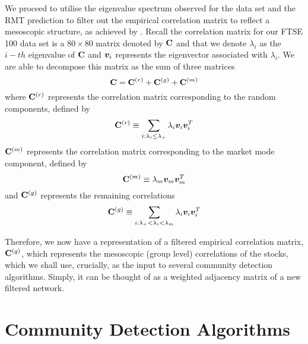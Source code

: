 We proceed to utilise the eigenvalue spectrum observed for the data set and the RMT prediction to filter out the empirical correlation matrix to reflect a mesoscopic structure, as achieved by \cite{MG13}. Recall the correlation matrix for our FTSE 100 data set is a $80 \times 80$ matrix denoted by $\mathbf C$ and that we denote $\lambda_{i}$ as the $i-th$ eigenvalue of $\mathbf C$ and $\vecvar{v_{i}}$ represents the eigenvector associated with $\lambda_{i}$. We are able to decompose this matrix as the sum of three matrices
\begin{equation}
\label{eq:decompositionCorrelationMatrix}
	\mathbf C = \mathbf C^{(r)} + \mathbf C^{(g)} + \mathbf C^{(m)}
\end{equation}
where $\mathbf C^{(r)}$ represents the correlation matrix corresponding to the random components, defined by
\begin{equation}
\label{eq:randomCorrelationMatrix}
	\matvar{C}^{(r)} \equiv \sum_{i:\lambda_{i}\leq\lambda_{+}} \lambda_{i} \vecvar{v_{i}} \transpose{\vecvar{v_{i}}}
\end{equation}
$\mathbf C^{(m)}$ represents the correlation matrix corresponding to the market mode component, defined by
\begin{equation}
\label{eq:marketModeCorrelationMatrix}
	\matvar{C}^{(m)} \equiv \lambda_{m} \vecvar{v_{m}} \transpose{\vecvar{v_{m}}}
\end{equation}
and $\mathbf C^{(g)}$ represents the remaining correlations
\begin{equation}
\label{eq:remainingCorrelationMatrix}
	\matvar{C}^{(g)} \equiv \sum_{i:\lambda_{+} < \lambda_{i} < \lambda_{m}} \lambda_{i} \vecvar{v_{i}} \transpose{\vecvar{v_{i}}}
\end{equation}

Therefore, we now have a representation of a filtered empirical correlation matrix, $\mathbf C^{(g)}$, which represents the mesoscopic (group level) correlations of the stocks, which we shall use, crucially, as the input to several community detection algorithms.
Simply, it can be thought of as a weighted adjacency matrix of a new filtered network.


\section{Community Detection Algorithms}
\label{sec:communityDetectionAlgorithms}


